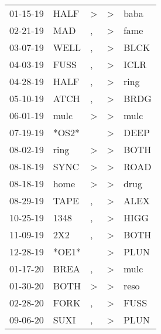 \begin{supertabular}{lllll}
 01-15-19 &   HALF &  \textgreater &     \textgreater &   baba \\
 02-21-19 &    MAD &             , &     \textgreater &   fame \\
 03-07-19 &   WELL &             , &     \textgreater &   BLCK \\
 04-03-19 &   FUSS &             , &     \textgreater &   ICLR \\
 04-28-19 &   HALF &             , &     \textgreater &   ring \\
 05-10-19 &   ATCH &             , &     \textgreater &   BRDG \\
 06-01-19 &   mulc &  \textgreater &     \textgreater &   mulc \\
 07-19-19 &  *OS2* &               &     \textgreater &   DEEP \\
 08-02-19 &   ring &  \textgreater &     \textgreater &   BOTH \\
 08-18-19 &   SYNC &  \textgreater &     \textgreater &   ROAD \\
 08-18-19 &   home &  \textgreater &     \textgreater &   drug \\
 08-29-19 &   TAPE &             , &     \textgreater &   ALEX \\
 10-25-19 &   1348 &             , &     \textgreater &   HIGG \\
 11-09-19 &    2X2 &             , &     \textgreater &   BOTH \\
 12-28-19 &  *OE1* &               &     \textgreater &   PLUN \\
 01-17-20 &   BREA &             , &     \textgreater &   mulc \\
 01-30-20 &   BOTH &  \textgreater &     \textgreater &   reso \\
 02-28-20 &   FORK &             , &     \textgreater &   FUSS \\
 09-06-20 &   SUXI &             , &     \textgreater &   PLUN \\
\end{supertabular}
